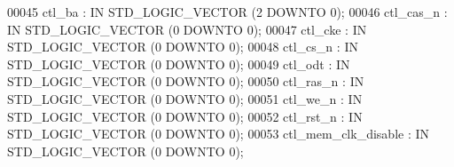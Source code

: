 \begin{DoxyCode}
{00045         \textcolor{vhdlchar}{ctl_ba}  \textcolor{vhdlchar}{:} \textcolor{keywordflow}{IN} \textcolor{comment}{STD\_LOGIC\_VECTOR} \textcolor{vhdlchar}{(}\textcolor{vhdllogic}{}\textcolor{vhdllogic}{2} \textcolor{keywordflow}{DOWNTO} \textcolor{vhdllogic}{}\textcolor{vhdllogic}{0}\textcolor{vhdlchar}{)};
00046         \textcolor{vhdlchar}{ctl_cas_n}   \textcolor{vhdlchar}{:} \textcolor{keywordflow}{IN} \textcolor{comment}{STD\_LOGIC\_VECTOR} \textcolor{vhdlchar}{(}\textcolor{vhdllogic}{}\textcolor{vhdllogic}{0} \textcolor{keywordflow}{DOWNTO} \textcolor{vhdllogic}{}\textcolor{vhdllogic}{0}\textcolor{vhdlchar}{)};
00047         \textcolor{vhdlchar}{ctl_cke} \textcolor{vhdlchar}{:} \textcolor{keywordflow}{IN} \textcolor{comment}{STD\_LOGIC\_VECTOR} \textcolor{vhdlchar}{(}\textcolor{vhdllogic}{}\textcolor{vhdllogic}{0} \textcolor{keywordflow}{DOWNTO} \textcolor{vhdllogic}{}\textcolor{vhdllogic}{0}\textcolor{vhdlchar}{)};
00048         \textcolor{vhdlchar}{ctl_cs_n}    \textcolor{vhdlchar}{:} \textcolor{keywordflow}{IN} \textcolor{comment}{STD\_LOGIC\_VECTOR} \textcolor{vhdlchar}{(}\textcolor{vhdllogic}{}\textcolor{vhdllogic}{0} \textcolor{keywordflow}{DOWNTO} \textcolor{vhdllogic}{}\textcolor{vhdllogic}{0}\textcolor{vhdlchar}{)};
00049         \textcolor{vhdlchar}{ctl_odt} \textcolor{vhdlchar}{:} \textcolor{keywordflow}{IN} \textcolor{comment}{STD\_LOGIC\_VECTOR} \textcolor{vhdlchar}{(}\textcolor{vhdllogic}{}\textcolor{vhdllogic}{0} \textcolor{keywordflow}{DOWNTO} \textcolor{vhdllogic}{}\textcolor{vhdllogic}{0}\textcolor{vhdlchar}{)};
00050         \textcolor{vhdlchar}{ctl_ras_n}   \textcolor{vhdlchar}{:} \textcolor{keywordflow}{IN} \textcolor{comment}{STD\_LOGIC\_VECTOR} \textcolor{vhdlchar}{(}\textcolor{vhdllogic}{}\textcolor{vhdllogic}{0} \textcolor{keywordflow}{DOWNTO} \textcolor{vhdllogic}{}\textcolor{vhdllogic}{0}\textcolor{vhdlchar}{)};
00051         \textcolor{vhdlchar}{ctl_we_n}    \textcolor{vhdlchar}{:} \textcolor{keywordflow}{IN} \textcolor{comment}{STD\_LOGIC\_VECTOR} \textcolor{vhdlchar}{(}\textcolor{vhdllogic}{}\textcolor{vhdllogic}{0} \textcolor{keywordflow}{DOWNTO} \textcolor{vhdllogic}{}\textcolor{vhdllogic}{0}\textcolor{vhdlchar}{)};
00052         \textcolor{vhdlchar}{ctl_rst_n}   \textcolor{vhdlchar}{:} \textcolor{keywordflow}{IN} \textcolor{comment}{STD\_LOGIC\_VECTOR} \textcolor{vhdlchar}{(}\textcolor{vhdllogic}{}\textcolor{vhdllogic}{0} \textcolor{keywordflow}{DOWNTO} \textcolor{vhdllogic}{}\textcolor{vhdllogic}{0}\textcolor{vhdlchar}{)};
00053         \textcolor{vhdlchar}{ctl_mem_clk_disable} \textcolor{vhdlchar}{:} \textcolor{keywordflow}{IN} \textcolor{comment}{STD\_LOGIC\_VECTOR} \textcolor{vhdlchar}{(}\textcolor{vhdllogic}{}\textcolor{vhdllogic}{0} \textcolor{keywordflow}{DOWNTO} \textcolor{vhdllogic}{}\textcolor{vhdllogic}{0}\textcolor{vhdlchar}{)};
}
\end{DoxyCode}
